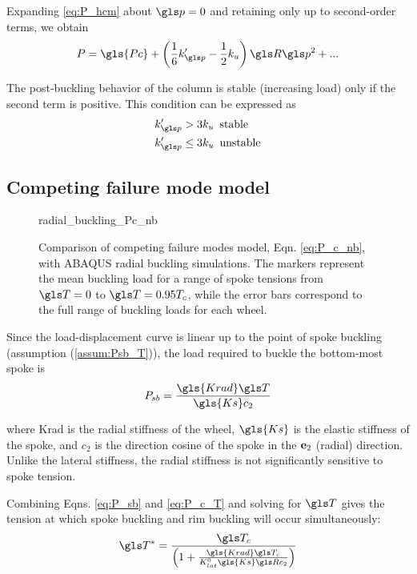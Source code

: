 \documentclass[\rootdir/thesis.tex]{subfiles}
\begin{document}
Expanding \eqref{eq:P_hcm} about $\p=0$ and retaining only up to second-order terms, we obtain
\begin{equation}
\label{eq:P_series_hcm}
P = \gls{Pc} + \left(\frac{1}{6}k'_{\p} - \frac{1}{2}k_u\right)\R\p^2 + ...
\end{equation}

The post-buckling behavior of the column is stable (increasing load) only if the second term is positive. This condition can be expressed as
\begin{align}
\begin{split}
\label{eq:pb_stability_hcm}
k'_{\p} > 3k_u & \,\,\,\text{stable}\\
k'_{\p} \leq 3k_u & \,\,\,\text{unstable}
\end{split}
\end{align}

\subsection{Competing failure mode model}
\label{sec:Pc_nb}

\begin{figure}[t]
\centering
{radial_buckling_Pc_nb}
\caption[Comparison of radial strength model and simulation results]{Comparison of competing failure modes model, Eqn. \eqref{eq:P_c_nb}, with ABAQUS radial buckling simulations. The markers represent the mean buckling load for a range of spoke tensions from $\T=0$ to $\T=0.95T_c$, while the error bars correspond to the full range of buckling loads for each wheel.}
\label{fig:Pc_rad_theory_comp}
\end{figure}

Since the load-displacement curve is linear up to the point of spoke buckling (assumption (\ref{assum:Psb_T})), the load required to buckle the bottom-most spoke is
\begin{equation}
\label{eq:P_sb}
P_{sb} = \frac{\gls{Krad} \T}{\gls{Ks} c_2}
\end{equation}

where \gls{Krad} is the radial stiffness of the wheel, $\gls{Ks}$ is the elastic stiffness of the spoke, and $c_2$ is the direction cosine of the spoke in the $\mathbf{e}_2$ (radial) direction. Unlike the lateral stiffness, the radial stiffness is not significantly sensitive to spoke tension.

Combining Eqns. \eqref{eq:P_sb} and \eqref{eq:P_c_T} and solving for $\T$ gives the tension at which spoke buckling and rim buckling will occur simultaneously:
\begin{equation}
\label{eq:T_nb}
\T^* = \frac{\T_c}{\left(1 + \frac{\gls{Krad} \T_c}{K_{lat}^0 \gls{Ks} \R c_2}\right)}
\end{equation}
\end{document}
